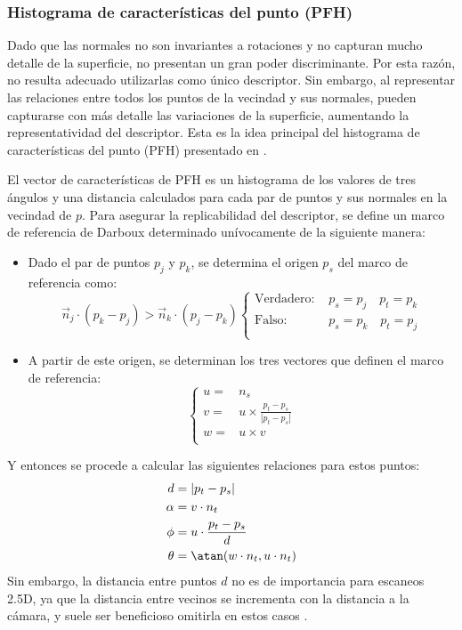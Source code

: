 \subsubsection{Histograma de características del punto (PFH)}
Dado que las normales no son invariantes a rotaciones y no capturan mucho
detalle de la superficie, no presentan un gran poder discriminante.
Por esta razón, no resulta adecuado utilizarlas como único descriptor. 
Sin embargo, al representar las relaciones entre todos los puntos de la vecindad y sus normales,
pueden capturarse con más detalle las variaciones de la superficie,
aumentando la representatividad del descriptor. 
Esta es la idea principal del histograma de características del punto (PFH) presentado en \cite{RusuDoctoralDissertation}.

El vector de características de PFH es un histograma de los valores de tres ángulos
y una distancia calculados para cada par de puntos y sus normales en la vecindad de $p$.
Para asegurar la replicabilidad del descriptor, se define un marco de referencia de Darboux
determinado unívocamente de la siguiente manera:
\begin{itemize}
	\item Dado el par de puntos $p_j$ y $p_k$, se determina el origen $p_s$ del marco de referencia como:
		\[
			\vec{n}_j \cdot (p_k - p_j) > \vec{n}_k \cdot (p_j - p_k)
			\begin{cases}
				\text{Verdadero: }& p_s = p_j \quad p_t = p_k\\
				\text{Falso: }& p_s = p_k \quad p_t = p_j\\
			\end{cases}
		\]
	\item A partir de este origen, se determinan los tres vectores que definen el marco de referencia:
\[
	\begin{cases}
		u =& n_s \\
		v =& u \times \displaystyle\frac{p_t - p_s}{|p_t - p_s|} \\
		w =& u \times v \\
	\end{cases}
\]
\end{itemize}
Y entonces se procede a calcular las siguientes relaciones para estos puntos:
	\begin{align*}
		d        &= |p_t - p_s| \\
		\alpha   &= v \cdot n_t \\
		\phi     &= u \cdot \frac{p_t - p_s}{d}\\
		\theta   &= \atan(w \cdot n_t, u \cdot n_t)
	\end{align*}
Sin embargo, la distancia entre puntos $d$ no es de importancia para escaneos 2.5D,
ya que la distancia entre vecinos se incrementa con la distancia a la cámara,
y suele ser beneficioso omitirla en estos casos \cite{RusuDoctoralDissertation}.

